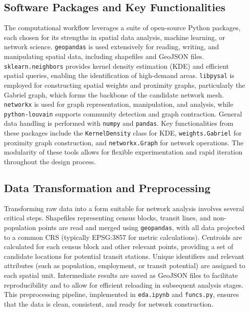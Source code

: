 \documentclass[manuscript,screen,review]{acmart}
\begin{document}
\subsection{Software Packages and Key Functionalities}
The computational workflow leverages a suite of open-source Python packages, each chosen for its strengths in spatial data analysis, machine learning, or network science. \texttt{geopandas} is used extensively for reading, writing, and manipulating spatial data, including shapefiles and GeoJSON files. \texttt{sklearn.neighbors} provides kernel density estimation (KDE) and efficient spatial queries, enabling the identification of high-demand areas. \texttt{libpysal} is employed for constructing spatial weights and proximity graphs, particularly the Gabriel graph, which forms the backbone of the candidate network mesh. \texttt{networkx} is used for graph representation, manipulation, and analysis, while \texttt{python-louvain} supports community detection and graph contraction. General data handling is performed with \texttt{numpy} and \texttt{pandas}. Key functionalities from these packages include the \texttt{KernelDensity} class for KDE, \texttt{weights.Gabriel} for proximity graph construction, and \texttt{networkx.Graph} for network operations. The modularity of these tools allows for flexible experimentation and rapid iteration throughout the design process.

\subsection{Data Transformation and Preprocessing}
Transforming raw data into a form suitable for network analysis involves several critical steps. Shapefiles representing census blocks, transit lines, and non-population points are read and merged using \texttt{geopandas}, with all data projected to a common CRS (typically EPSG:3857 for metric calculations). Centroids are calculated for each census block and other relevant points, providing a set of candidate locations for potential transit stations. Unique identifiers and relevant attributes (such as population, employment, or transit potential) are assigned to each spatial unit. Intermediate results are saved as GeoJSON files to facilitate reproducibility and to allow for efficient reloading in subsequent analysis stages. This preprocessing pipeline, implemented in \texttt{eda.ipynb} and \texttt{funcs.py}, ensures that the data is clean, consistent, and ready for network construction.
\end{document}
